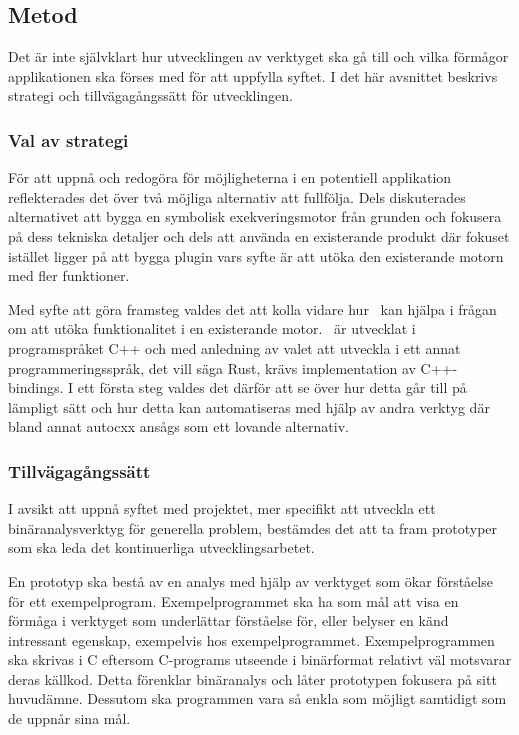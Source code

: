 \subsection{Metod}

Det är inte självklart hur utvecklingen av verktyget ska gå till och vilka
förmågor applikationen ska förses med för att uppfylla syftet. I det här
avsnittet beskrivs strategi och tillvägagångssätt för utvecklingen.

\subsubsection{Val av strategi}

För att uppnå och redogöra för möjligheterna i en potentiell applikation
reflekterades det över två möjliga alternativ att fullfölja. Dels diskuterades
alternativet att bygga en symbolisk exekveringsmotor från grunden och fokusera
på dess tekniska detaljer och dels att använda en existerande produkt där
fokuset istället ligger på att bygga plugin vars syfte är att utöka den
existerande motorn med fler funktioner.

Med syfte att göra framsteg valdes det att kolla vidare hur \stoe\ kan hjälpa i
frågan om att utöka funktionalitet i en existerande motor. \stoe\ är utvecklat
i programspråket C++ och med anledning av valet att utveckla i ett
annat programmeringsspråk, det vill säga Rust, krävs implementation av
C++-bindings. I ett första steg valdes det därför att se över hur detta går till
på lämpligt sätt och hur detta kan automatiseras med hjälp av andra verktyg
där bland annat autocxx ansågs som ett lovande alternativ.

\subsubsection{Tillvägagångssätt}

I avsikt att uppnå syftet med projektet, mer specifikt att utveckla ett
binäranalysverktyg för generella problem, bestämdes det att ta fram prototyper som ska leda det
kontinuerliga utvecklingsarbetet.

En prototyp ska bestå av en analys med hjälp av verktyget som ökar förståelse för
ett exempelprogram. Exempelprogrammet ska ha som mål att visa en förmåga i
verktyget som underlättar förståelse för, eller belyser en känd intressant
egenskap, exempelvis hos exempelprogrammet. Exempelprogrammen ska skrivas i C eftersom
C-programs utseende i binärformat relativt väl motsvarar deras källkod. Detta
förenklar binäranalys och låter prototypen fokusera på sitt huvudämne. Dessutom ska
programmen vara så enkla som möjligt samtidigt som de uppnår sina mål.

